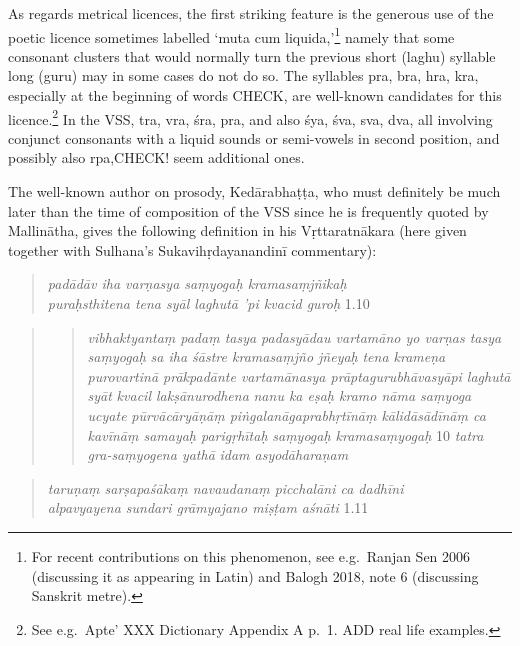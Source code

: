 \documentclass[]{article}
\begin{document}
As regards metrical licences, the first striking feature is the generous
use of the poetic licence sometimes labelled `muta cum
liquida,'\footnote{For recent contributions on this phenomenon, see
  e.g.~Ranjan Sen 2006 (discussing it as appearing in Latin) and Balogh
  2018, note 6 (discussing Sanskrit metre).} namely that some consonant
clusters that would normally turn the previous short (laghu) syllable
long (guru) may in some cases do not do so. The syllables pra, bra, hra,
kra, especially at the beginning of words CHECK, are well-known
candidates for this licence.\footnote{See e.g.~Apte' XXX Dictionary
  Appendix A p.~1. ADD real life examples.} In the VSS, tra, vra, śra,
pra, and also śya, śva, sva, dva, all involving conjunct consonants with
a liquid sounds or semi-vowels in second position, and possibly also
rpa,CHECK! seem additional ones.

The well-known author on prosody, Kedārabhaṭṭa, who must definitely be
much later than the time of composition of the VSS since he is
frequently quoted by Mallinātha, gives the following definition in his
Vṛttaratnākara (here given together with Sulhana's Sukavihṛdayanandinī
commentary):

\begin{quote}
\emph{padādāv iha varṇasya saṃyogaḥ kramasaṃjñikaḥ} \textbar{}\\
\emph{puraḥsthitena tena syāl laghutā 'pi kvacid guroḥ}
\textbar{}\textbar{} 1.10 \textbar{}\textbar{}
\end{quote}

\begin{quote}
\begin{quote}
\emph{vibhaktyantaṃ padaṃ tasya padasyādau vartamāno yo varṇas tasya
saṃyogaḥ} \textbar{} \emph{sa iha śāstre kramasaṃjño jñeyaḥ} \textbar{}
\emph{tena krameṇa purovartinā prākpadānte vartamānasya
prāptagurubhāvasyāpi laghutā syāt} \textbar{} \emph{kvacil
lakṣānurodhena} \textbar{} \emph{nanu ka eṣaḥ kramo nāma saṃyoga ucyate}
\textbar{} \emph{pūrvācāryāṇāṃ piṅgalanāgaprabhṛtīnāṃ kālidāsādīnāṃ ca
kavīnāṃ samayaḥ parigṛhītaḥ} \textbar{} \emph{saṃyogaḥ kramasaṃyogaḥ}
\textbar{}\textbar{} 10 \textbar{}\textbar{} \emph{tatra gra-saṃyogena
yathā} \textbar{} \emph{idam asyodāharaṇam} \textbar{}
\end{quote}
\end{quote}

\begin{quote}
\emph{taruṇaṃ sarṣapaśākaṃ navaudanaṃ picchalāni ca dadhīni}
\textbar{}\\
\emph{alpavyayena sundari grāmyajano miṣṭam aśnāti} \textbar{}\textbar{}
1.11 \textbar{}\textbar{}
\end{quote}
\end{document}
